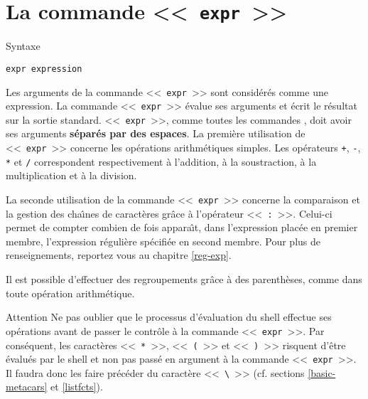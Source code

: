 \section{La commande <<~\texttt{expr}~>>}

\begin{definition}{Syntaxe}
\begin{verbatim}
expr expression
\end{verbatim}
\end{definition}

Les arguments de la commande <<~\texttt{expr}~>> sont consid{\'e}r{\'e}s comme une expression.
La commande <<~\texttt{expr}~>> {\'e}value ses arguments et {\'e}crit le r{\'e}sultat sur
la sortie standard. <<~\texttt{expr}~>>, comme toutes les commandes {\Unix},
doit avoir ses arguments \textbf{s{\'e}par{\'e}s par des espaces}.
La premi{\`e}re utilisation de <<~\texttt{expr}~>> concerne les op{\'e}rations arithm{\'e}tiques
simples. Les op{\'e}rateurs \verb=+=, \verb=-=, \verb=*= et \verb=/= correspondent
respectivement {\`a} l'addition, {\`a} la soustraction, {\`a} la multiplication et
{\`a} la division.

La seconde utilisation de la commande <<~\texttt{expr}~>> concerne la comparaison et
la gestion des cha{\^\i}nes de caract{\`e}res gr{\^a}ce {\`a} l'op{\'e}rateur <<~\verb=:=~>>.
Celui-ci permet de compter combien de fois appara{\^\i}t, dans l'expression plac{\'e}e
en premier membre, l'expression r{\'e}guli{\`e}re sp{\'e}cifi{\'e}e en second membre.
Pour plus de renseignements, reportez vous au chapitre \ref{reg-exp}.

Il est possible d'effectuer des regroupements gr{\^a}ce {\`a} des parenth{\`e}ses, comme
dans toute op{\'e}ration arithm{\'e}tique.

\begin{definition}{{\large Attention}}
Ne pas oublier que le processus d'{\'e}valuation du shell effectue ses op{\'e}rations
avant de passer le contr{\^o}le {\`a} la commande <<~\texttt{expr}~>>.
Par cons{\'e}quent, les caract{\`e}res <<~\verb=*=~>>, <<~\verb=(=~>> et
<<~\verb=)=~>> risquent d'{\^e}tre {\'e}valu{\'e}s par le shell et non
pas pass{\'e} en argument {\`a} la commande <<~\texttt{expr}~>>. Il
faudra donc les faire pr{\'e}c{\'e}der du caract{\`e}re <<~\verb=\=~>>
(cf. sections \ref{basic-metacars} et \ref{listfcts}).
\end{definition}


